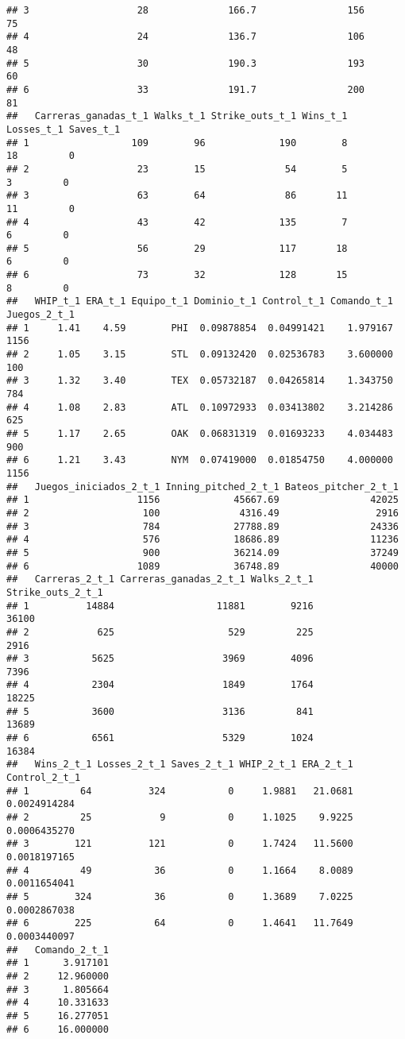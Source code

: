 \documentclass[
]{article}
\begin{document}
\begin{verbatim}
## 3                   28              166.7                156           75
## 4                   24              136.7                106           48
## 5                   30              190.3                193           60
## 6                   33              191.7                200           81
##   Carreras_ganadas_t_1 Walks_t_1 Strike_outs_t_1 Wins_t_1 Losses_t_1 Saves_t_1
## 1                  109        96             190        8         18         0
## 2                   23        15              54        5          3         0
## 3                   63        64              86       11         11         0
## 4                   43        42             135        7          6         0
## 5                   56        29             117       18          6         0
## 6                   73        32             128       15          8         0
##   WHIP_t_1 ERA_t_1 Equipo_t_1 Dominio_t_1 Control_t_1 Comando_t_1 Juegos_2_t_1
## 1     1.41    4.59        PHI  0.09878854  0.04991421    1.979167         1156
## 2     1.05    3.15        STL  0.09132420  0.02536783    3.600000          100
## 3     1.32    3.40        TEX  0.05732187  0.04265814    1.343750          784
## 4     1.08    2.83        ATL  0.10972933  0.03413802    3.214286          625
## 5     1.17    2.65        OAK  0.06831319  0.01693233    4.034483          900
## 6     1.21    3.43        NYM  0.07419000  0.01854750    4.000000         1156
##   Juegos_iniciados_2_t_1 Inning_pitched_2_t_1 Bateos_pitcher_2_t_1
## 1                   1156             45667.69                42025
## 2                    100              4316.49                 2916
## 3                    784             27788.89                24336
## 4                    576             18686.89                11236
## 5                    900             36214.09                37249
## 6                   1089             36748.89                40000
##   Carreras_2_t_1 Carreras_ganadas_2_t_1 Walks_2_t_1 Strike_outs_2_t_1
## 1          14884                  11881        9216             36100
## 2            625                    529         225              2916
## 3           5625                   3969        4096              7396
## 4           2304                   1849        1764             18225
## 5           3600                   3136         841             13689
## 6           6561                   5329        1024             16384
##   Wins_2_t_1 Losses_2_t_1 Saves_2_t_1 WHIP_2_t_1 ERA_2_t_1 Control_2_t_1
## 1         64          324           0     1.9881   21.0681  0.0024914284
## 2         25            9           0     1.1025    9.9225  0.0006435270
## 3        121          121           0     1.7424   11.5600  0.0018197165
## 4         49           36           0     1.1664    8.0089  0.0011654041
## 5        324           36           0     1.3689    7.0225  0.0002867038
## 6        225           64           0     1.4641   11.7649  0.0003440097
##   Comando_2_t_1
## 1      3.917101
## 2     12.960000
## 3      1.805664
## 4     10.331633
## 5     16.277051
## 6     16.000000
\end{verbatim}
\end{document}
